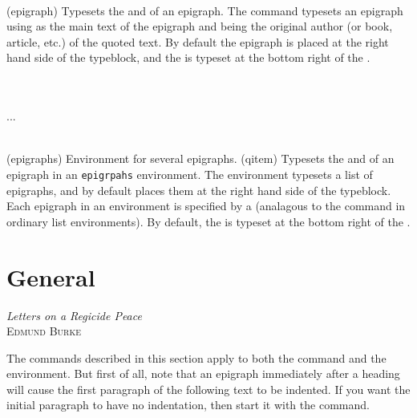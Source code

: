 \begin{syntax}
\cmd{\epigraph} \\
\end{syntax}
\glossary(epigraph)%
  {}%
  {Typesets the  and  of an epigraph.}
 The command \cmd{\epigraph}  typesets
 an epigraph using  as the main text of the epigraph and
  being the original author (or book, article, etc.)
 of the quoted text. By default the epigraph is placed at the right hand 
 side of the typeblock, and the  is typeset at the bottom
 right of the .


\begin{syntax}
  \\
  \cmd{\qitem} \\
  ... \\
 \\
\end{syntax}
\glossary(epigraphs)%
  {}%
  {Environment for several epigraphs.}
\glossary(qitem)%
  {}%
  {Typesets the  and  of an epigraph in an 
   \texttt{epigrpahs} environment.}
 The  environment typesets a list of epigraphs, and by default
 places them at the right hand side of the typeblock.
  Each epigraph in an  environment is specified by a 
 \cmd{\qitem} (analagous to the \cmd{\item}
 command in ordinary list environments).
 By default, the  is typeset at the bottom right of the
 . 

 
 \section{General}

      {\textit{Letters on a Regicide Peace}\\ \textsc{Edmund Burke}}

   The commands described in this section apply to both the \cmd{\epigraph}
command and the  environment. But first of all, note that an
epigraph immediately after a heading will cause the 
first paragraph
of the following text to be indented. If you want the initial paragraph
to have no indentation, then start it with the \cmd{\noindent} command.

